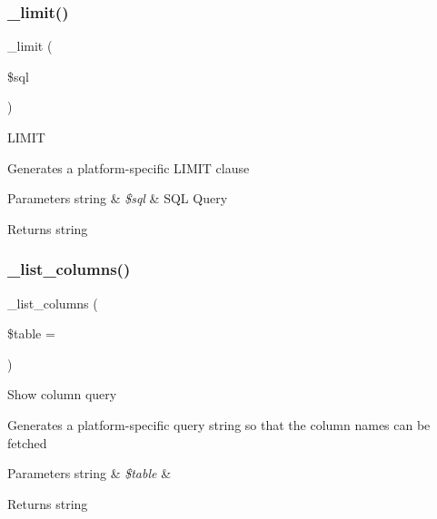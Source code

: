 \subsubsection{\texorpdfstring{\+\_\+limit()}{\_limit()}}
{\footnotesize\ttfamily \+\_\+limit (\begin{DoxyParamCaption}\item[{}]{\$sql }\end{DoxyParamCaption})\hspace{0.3cm}{\ttfamily [protected]}}

L\+I\+M\+IT

Generates a platform-\/specific L\+I\+M\+IT clause


\begin{DoxyParams}[1]{Parameters}
string & {\em \$sql} & S\+QL Query \\
\hline
\end{DoxyParams}
\begin{DoxyReturn}{Returns}
string 
\end{DoxyReturn}
\mbox{\label{class_c_i___d_b__ibase__driver_a7ccb7f9c301fe7f0a9db701254142b63}} 
\subsubsection{\texorpdfstring{\+\_\+list\+\_\+columns()}{\_list\_columns()}}
{\footnotesize\ttfamily \+\_\+list\+\_\+columns (\begin{DoxyParamCaption}\item[{}]{\$table = {\ttfamily \textquotesingle{}\textquotesingle{}} }\end{DoxyParamCaption})\hspace{0.3cm}{\ttfamily [protected]}}

Show column query

Generates a platform-\/specific query string so that the column names can be fetched


\begin{DoxyParams}[1]{Parameters}
string & {\em \$table} & \\
\hline
\end{DoxyParams}
\begin{DoxyReturn}{Returns}
string 
\end{DoxyReturn}
\mbox{\label{class_c_i___d_b__ibase__driver_a435c0f3ce54fe7daa178baa8532ebd54}} 
